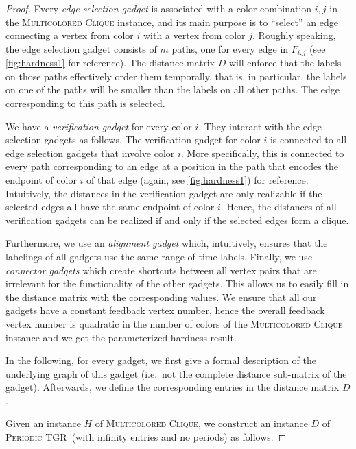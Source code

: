 \documentclass[a4paper,UKenglish,cleveref, autoref, thm-restate, anonymous]{lipics-v2021}
\newcommand{\deltaExact}{\textsc{Periodic TGR}}
\begin{document}
\begin{proof}
Every \emph{edge selection gadget} is associated with a color combination $i,j$ in the \textsc{Multicolored Clique} instance, and its main purpose is to ``select'' an edge connecting a vertex from color $i$ with a vertex from color $j$.
Roughly speaking, the edge selection gadget consists of $m$ paths, one for every edge in $F_{i,j}$ (see \cref{fig:hardness1} for reference). The distance matrix $D$ will enforce that the labels on those paths effectively order them temporally, that is, in particular, the labels on one of the paths will be smaller than the labels on all other paths. The edge corresponding to this path is selected.


 We have a \emph{verification gadget} for every color $i$. They interact with the edge selection gadgets as follows.
 The verification gadget for color $i$ is connected to all edge selection gadgets that involve color $i$. More specifically, this is connected to every path corresponding to an edge at a position in the path that encodes the endpoint of color $i$ of that edge (again, see \cref{fig:hardness1}) for reference. Intuitively, the distances in the verification gadget are only realizable if the selected edges all have the same endpoint of color $i$.
Hence, the distances of all verification gadgets can be realized if and only if the selected edges form a clique. 

Furthermore, we use an \emph{alignment gadget} which, intuitively, ensures that the labelings of all gadgets use the same range of time labels. Finally, we use \emph{connector gadgets} which create shortcuts between all vertex pairs that are irrelevant for the functionality of the other gadgets. This allows us to easily fill in the distance matrix with the corresponding values.
We ensure that all our gadgets have a constant feedback vertex number, hence the overall feedback vertex number is quadratic in the number of colors of the \textsc{Multicolored Clique} instance and we get the parameterized hardness result.

In the following, for every gadget, we first give a formal description of the underlying graph of this gadget (i.e.~not the complete distance sub-matrix of the gadget). Afterwards, we define the corresponding entries in the distance matrix $D$.

    Given an instance $H$ of \textsc{Multicolored Clique}, we construct an instance $D$ of \deltaExact\ (with infinity entries and no periods) as follows. 
    

\end{proof}
\end{document}
